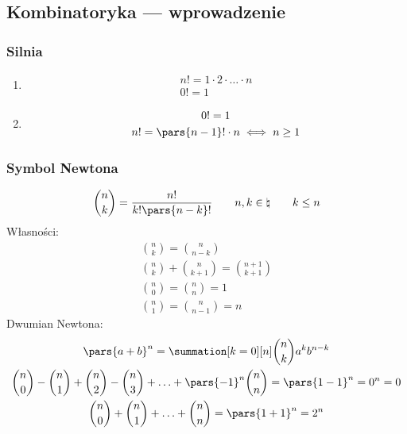 \subsection*{Kombinatoryka --- wprowadzenie}
\subsubsection*{Silnia}
\begin{enumerate}[label={\Roman*}]
    \item
        \begin{gather*}
            n! = 1 \cdot 2 \cdot \ldots \cdot n\\
            0! = 1
        \end{gather*}
    \item
        \begin{gather*}
            0! = 1\\
            n! = \pars{n - 1}! \cdot n \iff n \geq 1
        \end{gather*}
\end{enumerate}
\subsubsection*{Symbol Newtona}
\begin{equation*}
    \binom{n}{k} = \frac{n!}{k!\pars{n - k}!} \qquad n, k \in \natural \qquad k \leq n
\end{equation*}
Własności:
\begin{gather*}
    \binom{n}{k} = \binom{n}{n - k}\\
    \binom{n}{k} + \binom{n}{k + 1} = \binom{n + 1}{k + 1}\\
    \binom{n}{0} = \binom{n}{n} = 1\\
    \binom{n}{1} = \binom{n}{n - 1} = n
\end{gather*}
Dwumian Newtona:
\begin{gather*}
    \pars{a + b}^n
        = \summation[k = 0][n] \binom{n}{k}a^kb^{n - k}\\
    \binom{n}{0} - \binom{n}{1} + \binom{n}{2} - \binom{n}{3} + \ldots + \pars{-1}^n\binom{n}{n}
        = \pars{1 - 1}^n
        = 0^n
        = 0\\
    \binom{n}{0} + \binom{n}{1} + \ldots + \binom{n}{n}
        = \pars{1 + 1}^n
        = 2^n
\end{gather*}
